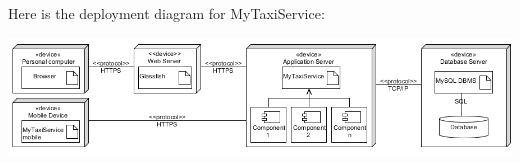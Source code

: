 Here is the deployment diagram for MyTaxiService:

\begin{center}
	\includegraphics[width=\textwidth]{diagrams/deployment.png}
\end{center}